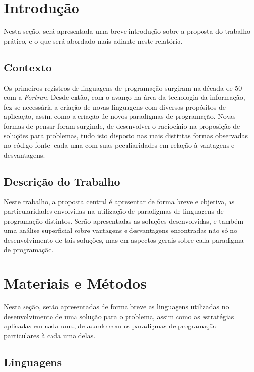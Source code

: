 \documentclass[a4paper, 12pt]{article}
\begin{document}
\tableofcontents
\newpage
\section{Introdução}

Nesta seção, será apresentada uma breve introdução sobre a proposta do trabalho prático, e o que será abordado mais adiante neste relatório.

\subsection{Contexto}

Os primeiros registros de linguagens de programação surgiram na década de 50 com a \emph{Fortran}. Desde então, com o avanço na área da tecnologia da informação, fez-se necessária a criação de novas linguagens com diversos propósitos de aplicação, assim como a criação de novos paradigmas de programação. Novas formas de pensar foram surgindo, de desenvolver o raciocínio na proposição de soluções para problemas, tudo isto disposto nas mais distintas formas observadas no código fonte, cada uma com suas peculiaridades em relação à vantagens e desvantagens.

\subsection{Descrição do Trabalho}

Neste trabalho, a proposta central é apresentar de forma breve e objetiva, as particularidades envolvidas na utilização de paradigmas de linguagens de programação distintos. Serão apresentadas as soluções desenvolvidas, e também uma análise superficial sobre vantagens e desvantagens encontradas não só no desenvolvimento de tais soluções, mas em aspectos gerais sobre cada paradigma de programação.

\section{Materiais e Métodos}

Nesta seção, serão apresentadas de forma breve as linguagens utilizadas no desenvolvimento de uma solução para o problema, assim como as estratégias aplicadas em cada uma, de acordo com os paradigmas de programação particulares à cada uma delas.

\subsection{Linguagens}
\end{document}
